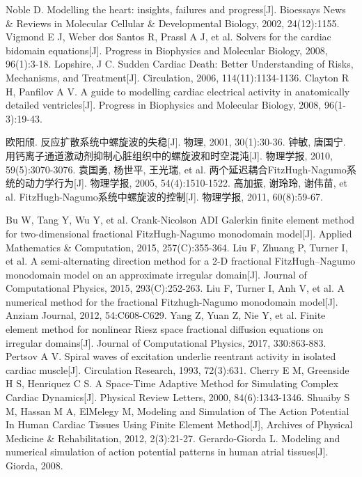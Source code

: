 \documentclass[twoside,UTF8]{nputhesis}
\begin{document}
\begin{thebibliography}{99}
	Noble D. Modelling the heart: insights, failures and progress[J]. Bioessays News \& Reviews in Molecular Cellular \& Developmental Biology, 2002, 24(12):1155.
	Vigmond E J, Weber dos Santos R, Prassl A J, et al. Solvers for the cardiac bidomain equations[J]. Progress in Biophysics and Molecular Biology, 2008, 96(1):3-18.
	Lopshire, J C. Sudden Cardiac Death: Better Understanding of Risks, Mechanisms, and Treatment[J]. Circulation, 2006, 114(11):1134-1136.
	Clayton R H, Panfilov A V. A guide to modelling cardiac electrical activity in anatomically detailed ventricles[J]. Progress in Biophysics and Molecular Biology, 2008, 96(1-3):19-43.
	
	欧阳颀. 反应扩散系统中螺旋波的失稳[J]. 物理, 2001, 30(1):30-36.
	钟敏, 唐国宁. 用钙离子通道激动剂抑制心脏组织中的螺旋波和时空混沌[J]. 物理学报, 2010, 59(5):3070-3076.
	袁国勇, 杨世平, 王光瑞, et al. 两个延迟耦合FitzHugh-Nagumo系统的动力学行为[J]. 物理学报, 2005, 54(4):1510-1522.
	高加振, 谢玲玲, 谢伟苗, et al. FitzHugh-Nagumo系统中螺旋波的控制[J]. 物理学报, 2011, 60(8):59-67.
	
	Bu W, Tang Y, Wu Y, et al. Crank-Nicolson ADI Galerkin finite element method for two-dimensional fractional FitzHugh-Nagumo monodomain model[J]. Applied Mathematics \& Computation, 2015, 257(C):355-364.
	Liu F, Zhuang P, Turner I, et al. A semi-alternating direction method for a 2-D fractional FitzHugh–Nagumo monodomain model on an approximate irregular domain[J]. Journal of Computational Physics, 2015, 293(C):252-263.
	Liu F, Turner I, Anh V, et al. A numerical method for the fractional Fitzhugh-Nagumo monodomain model[J]. Anziam Journal, 2012, 54:C608-C629.
	Yang Z, Yuan Z, Nie Y, et al. Finite element method for nonlinear Riesz space fractional
	diffusion equations on irregular domains[J]. Journal of Computational Physics, 2017, 330:863-883.
	Pertsov A V. Spiral waves of excitation underlie reentrant activity in isolated cardiac muscle[J]. Circulation Research, 1993, 72(3):631.
	Cherry E M, Greenside H S, Henriquez C S. A Space-Time Adaptive Method for Simulating Complex Cardiac Dynamics[J]. Physical Review Letters, 2000, 84(6):1343-1346.
	Shuaiby S M, Hassan M A, ElMelegy M, Modeling and Simulation of The Action Potential In Human Cardiac Tissues Using Finite Element Method[J], Archives of Physical Medicine \& Rehabilitation, 2012, 2(3):21-27.
	Gerardo-Giorda L. Modeling and numerical simulation of action potential patterns in human atrial tissues[J]. Giorda, 2008.
	

\end{thebibliography}
\end{document}
